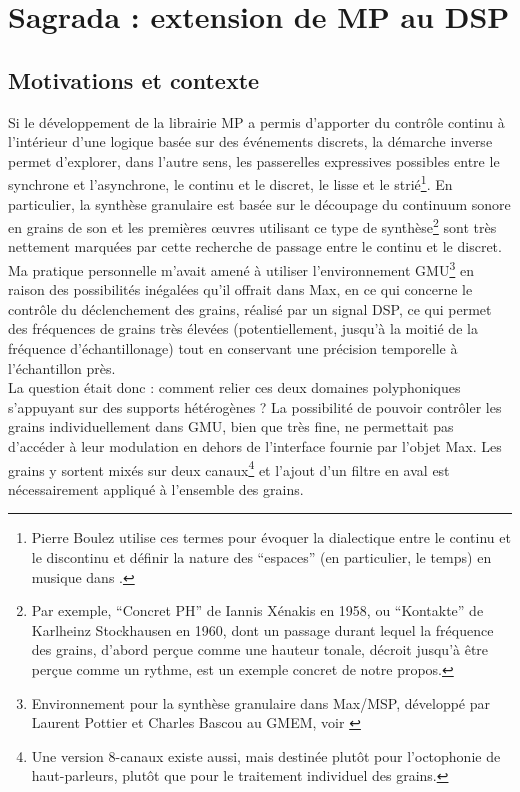 \section{Sagrada : extension de MP au DSP}
\label{sec:algorithms:sagrada}

\subsection{Motivations et contexte}

\noindent Si le développement de la librairie MP a permis d'apporter du contrôle continu à l'intérieur d'une logique basée sur des événements discrets, la démarche inverse permet d'explorer, dans l'autre sens, les passerelles expressives possibles entre le synchrone et l'asynchrone, le continu et le discret, le lisse et le strié\footnote{Pierre Boulez utilise ces termes pour évoquer la dialectique entre le continu et le discontinu et définir la nature des ``espaces'' (en particulier, le temps) en musique dans \cite{boulez_penser_1987}.}. En particulier, la synthèse granulaire est basée sur le découpage du continuum sonore en grains de son et les premières œuvres utilisant ce type de synthèse\footnote{Par exemple, ``Concret PH'' de Iannis Xénakis en 1958, ou ``Kontakte'' de Karlheinz Stockhausen en 1960, dont un passage durant lequel la fréquence des grains, d'abord perçue comme une hauteur tonale, décroit jusqu'à être perçue comme un rythme, est un exemple concret de notre propos.} sont très nettement marquées par cette recherche de passage entre le continu et le discret.\\
\indent Ma pratique personnelle m'avait amené à utiliser l'environnement \gls{GMU}\footnote{Environnement pour la synthèse granulaire dans Max/MSP, développé par Laurent Pottier et Charles Bascou au \gls{GMEM}, voir \cite{bascou_gmu_2005}} en raison des possibilités inégalées qu'il offrait dans Max, en ce qui concerne le contrôle du déclenchement des grains, réalisé par un signal \gls{DSP}, ce qui permet des fréquences de grains très élevées (potentiellement, jusqu'à la moitié de la fréquence d'échantillonage) tout en conservant une précision temporelle à l'échantillon près.\\
\indent La question était donc : comment relier ces deux domaines polyphoniques s'appuyant sur des supports hétérogènes ? La possibilité de pouvoir contrôler les grains individuellement dans \gls{GMU}, bien que très fine, ne permettait pas d'accéder à leur modulation en dehors de l'interface fournie par l'objet Max. Les grains y sortent mixés sur deux canaux\footnote{Une version 8-canaux existe aussi, mais destinée plutôt pour l'octophonie de haut-parleurs, plutôt que pour le traitement individuel des grains.} et l'ajout d'un filtre en aval est nécessairement appliqué à l'ensemble des grains.\\
